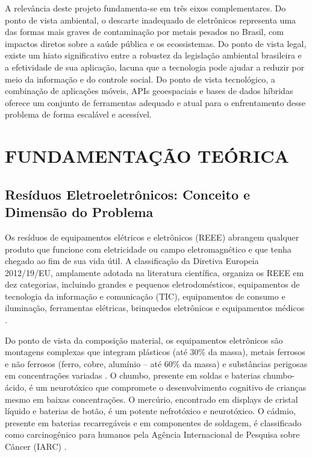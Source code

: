 \documentclass[12pt, a4paper]{article}
\numberwithin{equation}{section}
\numberwithin{figure}{section}
\numberwithin{table}{section}
\begin{document}
A relevância deste projeto fundamenta-se em três eixos complementares.
Do ponto de vista ambiental, o descarte inadequado de eletrônicos representa
uma das formas mais graves de contaminação por metais pesados no Brasil,
com impactos diretos sobre a saúde pública e os ecossistemas. Do ponto de
vista legal, existe um hiato significativo entre a robustez da legislação
ambiental brasileira e a efetividade de sua aplicação, lacuna que a tecnologia
pode ajudar a reduzir por meio da informação e do controle social. Do ponto
de vista tecnológico, a combinação de aplicações móveis, APIs geoespaciais e
bases de dados híbridas oferece um conjunto de ferramentas adequado e atual
para o enfrentamento desse problema de forma escalável e acessível.

\section{FUNDAMENTAÇÃO TEÓRICA}

\subsection{Resíduos Eletroeletrônicos: Conceito e Dimensão do Problema}

Os resíduos de equipamentos elétricos e eletrônicos (REEE) abrangem qualquer
produto que funcione com eletricidade ou campo eletromagnético e que tenha
chegado ao fim de sua vida útil. A classificação da Diretiva Europeia
2012/19/EU, amplamente adotada na literatura científica, organiza os REEE em
dez categorias, incluindo grandes e pequenos eletrodomésticos, equipamentos de
tecnologia da informação e comunicação (TIC), equipamentos de consumo e
iluminação, ferramentas elétricas, brinquedos eletrônicos e equipamentos
médicos \cite{europarlamento2012}.

Do ponto de vista da composição material, os equipamentos eletrônicos são
montagens complexas que integram plásticos (até 30\% da massa), metais ferrosos
e não ferrosos (ferro, cobre, alumínio -- até 60\% da massa) e substâncias
perigosas em concentrações variadas \cite{baldé2017}. O chumbo, presente em
soldas e baterias chumbo-ácido, é um neurotóxico que compromete o desenvolvimento
cognitivo de crianças mesmo em baixas concentrações. O mercúrio, encontrado em
displays de cristal líquido e baterias de botão, é um potente nefrotóxico
e neurotóxico. O cádmio, presente em baterias recarregáveis e em componentes
de soldagem, é classificado como carcinogênico para humanos pela Agência
Internacional de Pesquisa sobre Câncer (IARC) \cite{singh2020}.
\end{document}
